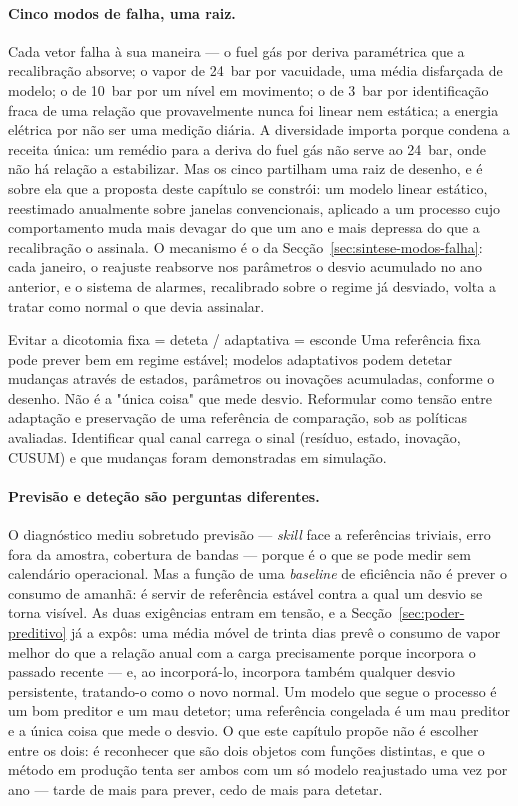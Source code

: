 \paragraph{Cinco modos de falha, uma raiz.} Cada vetor falha à sua maneira
--- o fuel gás por deriva paramétrica que a recalibração absorve; o vapor de
24~bar por vacuidade, uma média disfarçada de modelo; o de 10~bar por um
nível em movimento; o de 3~bar por identificação fraca de uma relação que
provavelmente nunca foi linear nem estática; a energia elétrica por não ser
uma medição diária. A diversidade importa porque condena a receita única: um
remédio para a deriva do fuel gás não serve ao 24~bar, onde não há relação a
estabilizar. Mas os cinco partilham uma raiz de desenho, e é sobre ela que a
proposta deste capítulo se constrói: um modelo linear estático, reestimado
anualmente sobre janelas convencionais, aplicado a um processo cujo
comportamento muda mais devagar do que um ano e mais depressa do que a
recalibração o assinala. O mecanismo é o da Secção~\ref{sec:sintese-modos-falha}:
cada janeiro, o reajuste reabsorve nos parâmetros o desvio acumulado no ano
anterior, e o sistema de alarmes, recalibrado sobre o regime já desviado,
volta a tratar como normal o que devia assinalar.

{Evitar a dicotomia fixa = deteta / adaptativa = esconde}
{Uma referência fixa pode prever bem em regime estável; modelos
adaptativos podem detetar mudanças através de estados, parâmetros ou
inovações acumuladas, conforme o desenho. Não é a "única coisa" que
mede desvio. Reformular como tensão entre adaptação e preservação de
uma referência de comparação, sob as políticas avaliadas. Identificar
qual canal carrega o sinal (resíduo, estado, inovação, CUSUM) e que
mudanças foram demonstradas em simulação.}%
\paragraph{Previsão e deteção são perguntas diferentes.} O diagnóstico mediu
sobretudo previsão --- \emph{skill} face a referências triviais, erro fora
da amostra, cobertura de bandas --- porque é o que se pode medir sem
calendário operacional. Mas a função de uma \emph{baseline} de eficiência
não é prever o consumo de amanhã: é servir de referência estável contra a
qual um desvio se torna visível. As duas exigências entram em tensão, e a
Secção~\ref{sec:poder-preditivo} já a expôs: uma média móvel de trinta dias
prevê o consumo de vapor melhor do que a relação anual com a carga
precisamente porque incorpora o passado recente --- e, ao incorporá-lo,
incorpora também qualquer desvio persistente, tratando-o como o novo
normal. Um modelo que segue o processo é um bom preditor e um mau detetor;
uma referência congelada é um mau preditor e a única coisa que mede o
desvio. O que este capítulo propõe não é escolher entre os dois: é
reconhecer que são dois objetos com funções distintas, e que o método em
produção tenta ser ambos com um só modelo reajustado uma vez por ano ---
tarde de mais para prever, cedo de mais para detetar.

